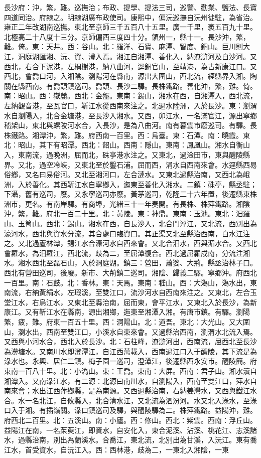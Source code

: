 \begin{pinyinscope}
長沙府：沖，繁，難。巡撫治；布政、提學、提法三司，巡警、勸業、鹽法、長寶四道同治。府隸之。明隸湖廣布政使司。康熙中，偏沅巡撫自沅州徙駐，為省治。雍正二年改湖南巡撫。東北至京師三千五百八十五里。廣一千里，袤五百九十里。北極高二十八度十三分。京師偏西三度四十分。領州一，縣十一。長沙沖，繁，難。倚。東：天井。西：谷山。北：羅洋、石寶、麻潭、智度、銅山。巨川則大江，洞庭湖匯湘、沅、資、澧入焉。湘江自湘潭、善化入，納潦滸河及白沙河。又西北，右合下泥港，左桐樹港，納八曲河，逕銅官山，至靖港，為古新康江口。又西北，會喬口河，入湘陰。瀏陽河在縣南，源出大圍山，西北流，經縣界入湘。陶關在縣西南。有喬頭鎮巡司。喬頭、長沙二驛。長株鐵路。善化沖，繁，難。倚。南：昭山。西：嶽麓。西北：金盤。東南：錫山，湘水在西，自湘潭入，西北流，左納觀音港，至瓦官口，靳江水從西南來注之。北過水陸洲，入於長沙。東：瀏渭水自瀏陽入，北合金塘港，至長沙入湘水。又西，卯江水，一名滿官江，源出寧鄉嵇架山，東北與螺陂河水合，入長沙，是為八曲河。南有暮雲市廢巡司。有驛。長株鐵路。湘潭沖，繁，難。府西南一百里。西：烏臺。東：石潭。南：曉霞。東北：昭山，其下有昭潭。西北：韶山。西南：隱山。東南：鳳凰山。湘水自衡山入，東南流，過晚洲，屈而北，硃亭港水注之。又東北，過淦田市，東與醴陵縣界。又北，過空冷峽，又東北至於鑿石浦。屈而西，涓水自西南來會。水逕縣西易俗鄉，又名曰易俗河。又北至湘河口，左合漣水。又東北過縣治南，又西北為峨洲，入於善化。其西靳江水自寧鄉入，迤東至善化入湘水。二鎮：硃亭，縣丞駐；下灄，舊有巡司，廢。又永寧巡司亦廢。黃茅巡司，乾隆二十六年置，後遷縣東株洲市，更名。有南岸驛。有商埠，光緒三十一年奏開。有長株、株萍鐵路。湘陰沖，繁，難。府北一百二十里。北：黃陵。東：神鼎。東南：玉池。東北：汨羅山、玉笥山。西北：錫山。湘水在西，自長沙入，北合門涇江，又北流，西別出為濠河水，西北與資水分流，其合處曰臨資口。其正渠又北至縣治西南，白水江注之。又北過蘆林潭，錫江水合濠河水自西來會。又北合汨水，西與湄水合。又西北會羅水，為汨羅江，西北流，歧為二，至屈潭復合。西北過屈羅戍南，分流注湘水。湘水西北至磊石山，入於洞庭湖。鎮三：營田，蕭婆、大荊。縣丞治林子口。西北有營田巡司，後廢。新市、大荊鎮二巡司。湘陰、歸義二驛。寧鄉沖。府西北一百里。南：石鼓。北：香林。東：天馬。東南：嵇山。西：大溈山，溈水出，東南流，右納黃絹水，左瑕溪，至雙江口，流沙河水自西南來注之。又東北，左合玉堂江水，右烏江水，又東北至縣治南，屈而東，會平江水，又東北入於長沙，為新康江。又有靳江水在縣南，源出湘鄉，迤東至湘潭入湘。有唐市鎮。有驛。瀏陽繁，疲，難。府東一百五十里。西：洞陽山。北：道吾。東北：大光山。又大圍山，瀏水出，西南至雙江口，小溪水自東來會。又過縣治西南，瀏渭水北流入焉。又西與小河水合，西北入於長沙。北：石柱峰，潦滸河出，西南流，屈西北至長沙為澇塘水。又南川水即澄潭江，自江西萬載入，西南過江口入于醴陵，其下流是為淥水也。永興、居仁二鎮。梅子園一巡司，澄潭江，後遷縣西永安市。醴陵簡。府東南一百八十里。北：小溈山。東：王喬。東南：大屏。西南：君子山。湘水瀆自湘潭入。又南淥江水，有二源：北源曰南川水，自瀏陽入，西南至雙江口，萍水自南來會；水出江西萍鄉縣，是為南源。又西過縣治南，右納姜灣水，又西與鐵江水合。水一名北江，自攸縣入，北合清水江，又北流為泗汾河。水又北入淥水，至淥口入于湘。有插嶺關。淥口鎮巡司及驛，與醴陵驛為二。株萍鐵路。益陽沖，難。府西北二百里。北：五溪山。南：小廬。西：修山。西北：紫雲。西南：浮丘山。益陽江在南，一名茱萸江，即資水，自安化入，東合泥溪、沾溪、桃花江、志溪諸水，過縣治南，別出為蘭溪水。合喬江，東北流，北別出為甘溪，入沅江。東有喬江水，首受資水，自沅江入。西：西林港，歧為二，一東北入湘陰，一東
\end{pinyinscope}
